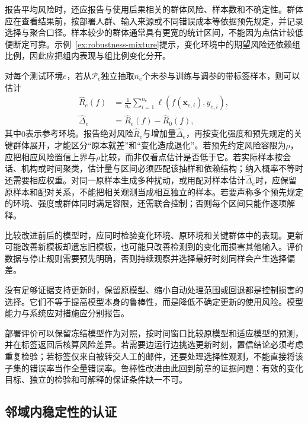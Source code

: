 报告平均风险时，还应报告与使用后果相关的群体风险、样本数和不确定性。群体应在查看结果前，按部署人群、输入来源或不同错误成本等依据预先规定，并记录选择与聚合口径。样本较少的群体通常具有更宽的统计区间，不能因为点估计较低便断定可靠。示例~\ref{ex:robustness-mixture}提示，变化环境中的期望风险还依赖组比例，因此应把组内表现与组比例变化分开。

对每个测试环境$e$，若从$\mathcal P_e$独立抽取$n_e$个未参与训练与调参的带标签样本，则可以估计
\begin{equation}
 \begin{aligned}
 \widehat R_e(f)&=\frac{1}{n_e}\sum_{i=1}^{n_e}
       \ell(f(\bm{x}_{e,i}),y_{e,i}),\\
 \widehat\Delta_e&=\widehat R_e(f)-\widehat R_0(f),
 \end{aligned}
 \label{eq:robustness-environment-test}
\end{equation}
其中$0$表示参考环境。报告绝对风险$\widehat R_e$与增加量$\widehat\Delta_e$，再按变化强度和预先规定的关键群体展开，才能区分“原本就差”和“变化造成退化”。若预先约定风险容限为$\rho$，应把相应风险置信上界与$\rho$比较，而非仅看点估计是否低于它。若实际样本按会话、机构或时间聚类，估计量与区间必须匹配该抽样和依赖结构；纳入概率不等时还需要相应权重。对同一原样本生成多种扰动，或用配对样本估计$\widehat\Delta_e$时，应保留原样本和配对关系，不能把相关观测当成相互独立的样本。若要声称多个预先规定的环境、强度或群体同时满足容限，还需联合控制；否则每个区间只能作逐项解释。

比较改进前后的模型时，应同时检验变化环境、原环境和关键群体中的表现。更新可能改善新模板却遗忘旧模板，也可能只改善检测到的变化而损害其他输入。评价数据与停止规则需要预先明确，否则持续观察并选择最好时刻同样会产生选择偏差。

没有足够证据支持更新时，保留原模型、缩小自动处理范围或回退都是控制损害的选择。它们不等于提高模型本身的鲁棒性，而是降低不确定更新的使用风险。模型能力与系统应对措施应分别报告。

部署评价可以保留冻结模型作为对照，按时间窗口比较原模型和适应模型的预测，并在标签返回后核算风险差异。若需要边运行边挑选更新时刻，置信结论必须考虑重复检验；若标签仅来自被转交人工的邮件，还要处理选择性观测，不能直接将该子集的错误率当作全量错误率。鲁棒性改进由此回到前章的证据问题：有效的变化目标、独立的检验和可解释的保证条件缺一不可。

\subsection{邻域内稳定性的认证}
\label{sec:robustness-certification}

